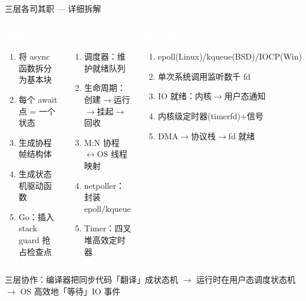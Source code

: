 \begin{frame}{三层各司其职 — 详细拆解}
  \begin{columns}[T]
    \begin{block}{\textcolor{white}{\textbf{编译器}}}
      \color{white}
      \begin{enumerate}
        \footnotesize
        \item 将 async 函数拆分为基本块
        \item 每个 await 点 = 一个状态
        \item 生成协程帧结构体
        \item 生成状态机驱动函数
        \item Go：插入 stack guard 抢占检查点
      \end{enumerate}
    \end{block}

    \begin{block}{\textcolor{white}{\textbf{运行时}}}
      \color{white}
      \begin{enumerate}
        \footnotesize
        \item 调度器：维护就绪队列
        \item 生命周期：创建$\rightarrow$运行$\rightarrow$挂起$\rightarrow$回收
        \item M:N 协程$\leftrightarrow$OS 线程映射
        \item netpoller：封装 epoll/kqueue
        \item Timer：四叉堆高效定时器
      \end{enumerate}
    \end{block}

    \begin{exampleblock}{\textcolor{white}{\textbf{操作系统}}}
      \color{white}
      \begin{enumerate}
        \footnotesize
        \item epoll(Linux)/kqueue(BSD)/IOCP(Win)
        \item 单次系统调用监听数千 fd
        \item IO 就绪：内核$\rightarrow$用户态通知
        \item 内核级定时器(timerfd)+信号
        \item DMA$\rightarrow$协议栈$\rightarrow$fd 就绪
      \end{enumerate}
    \end{exampleblock}
  \end{columns}

  \vspace{0.5em}
  \centering
  {\footnotesize\color{corGray}三层协作：编译器把同步代码「翻译」成状态机 $\rightarrow$ 运行时在用户态调度状态机 $\rightarrow$ OS 高效地「等待」IO 事件}
\end{frame}


